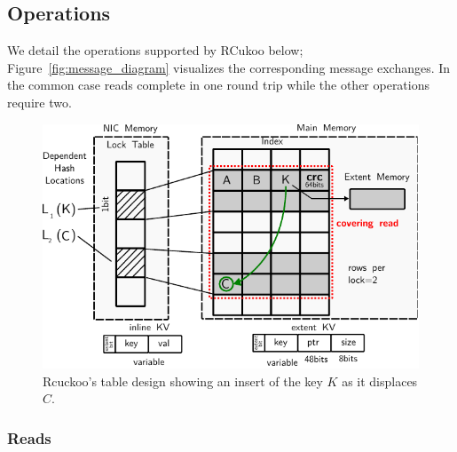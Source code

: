 


\subsection{Operations}

We detail the operations supported by RCukoo below;
Figure~\ref{fig:message_diagram} visualizes the corresponding message
exchanges. In the common case reads complete in one round trip while
the other operations require two.


\begin{figure}[t]
    \includegraphics[width=0.99\linewidth]{fig/table-diagram.pdf}
    \caption{Rcuckoo's table design showing an insert of the key $K$ as it displaces $C$.~}
    \label{fig:table-diagram}
\end{figure}




\subsubsection{Reads} 
\label{sec:reading}

